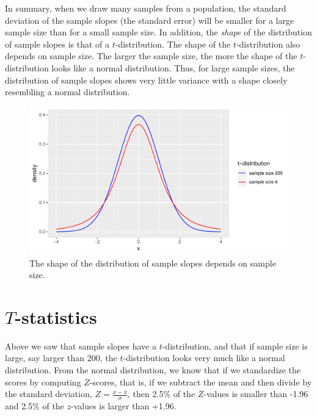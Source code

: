 \documentclass[]{report}\usepackage[]{graphicx}\usepackage[]{color}
\makeatletter
\def\maxwidth{ %
  \ifdim\Gin@nat@width>\linewidth
    \linewidth
  \else
    \Gin@nat@width
  \fi
}
\newenvironment{knitrout}{}{} %
\makeatother
\begin{document}
In summary, when we draw many samples from a population, the standard deviation of the sample slopes (the standard error) will be smaller for a large sample size than for a small sample size. In addition, the \textit{shape} of the distribution of sample slopes is that of a $t$-distribution. The shape of the $t$-distribution also depends on sample size. The larger the sample size, the more the shape of the $t$-distribution looks like a normal distribution. Thus, for large sample sizes, the distribution of sample slopes shows very little variance with a shape closely resembling a normal distribution.


\begin{knitrout}
\color{fgcolor}\begin{figure}

{\centering \includegraphics[width=\maxwidth]{figure/inf_9-1} 

}

\caption[The shape of the distribution of sample slopes depends on sample size]{The shape of the distribution of sample slopes depends on sample size.}\label{fig:inf_9}
\end{figure}


\end{knitrout}





\section{$T$-statistics}


Above we saw that sample slopes have a $t$-distribution, and that if sample size is large, say larger than 200, the $t$-distribution looks very much like a normal distribution. From the normal distribution, we know that if we standardize the scores by computing $Z$-scores, that is, if we subtract the mean and then divide by the standard deviation, $Z= \frac{x-\bar{x}}{\sigma}$, then 2.5\% of the $Z$-values is smaller than -1.96 and 2.5\% of the $z$-values is larger than +1.96.
\end{document}
